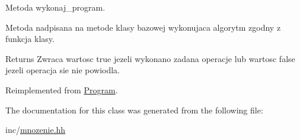 Metoda wykonaj\-\_\-program. 

Metoda nadpisana na metode klasy bazowej wykonujaca algorytm zgodny z funkcja klasy. \begin{DoxyReturn}{Returns}
Zwraca wartosc true jezeli wykonano zadana operacje lub wartosc false jezeli operacja sie nie powiodla. 
\end{DoxyReturn}


Reimplemented from \hyperlink{class_program_ac396401ba5cade863d0e6acb727bec4e}{Program}.



The documentation for this class was generated from the following file\-:\begin{DoxyCompactItemize}
\item 
inc/\hyperlink{mnozenie_8hh}{mnozenie.\-hh}\end{DoxyCompactItemize}
